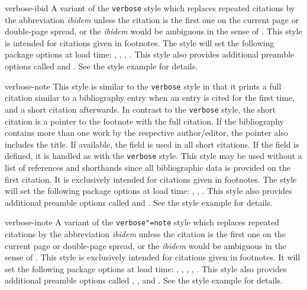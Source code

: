 \begin{marglist}
\item[verbose-ibid]
A variant of the \texttt{verbose} style which replaces repeated citations by the abbreviation \emph{ibidem} unless the citation is the first one on the current page or double-page spread, or the \emph{ibidem} would be ambiguous in the sense of . This style is intended for citations given in footnotes. The style will set the following package options at load time: , , , . This style also provides additional preamble options called  and . See the style example for details.

\item[verbose-note]
This style is similar to the \texttt{verbose} style in that it prints a full citation similar to a bibliography entry when an entry is cited for the first time, and a short citation afterwards. In contrast to the \texttt{verbose} style, the short citation is a pointer to the footnote with the full citation. If the bibliography contains more than one work by the respective author\slash editor, the pointer also includes the title. If available, the  field is used in all short citations. If the  field is defined, it is handled as with the \texttt{verbose} style. This style may be used without a list of references and shorthands since all bibliographic data is provided on the first citation. It is exclusively intended for citations given in footnotes. The style will set the following package options at load time: , , . This style also provides additional preamble options called  and . See the style example for details.

\item[verbose-inote]
A variant of the \texttt{verbose"=note} style which replaces repeated citations by the abbreviation \emph{ibidem} unless the citation is the first one on the current page or double-page spread, or the \emph{ibidem} would be ambiguous in the sense of . This style is exclusively intended for citations given in footnotes. It will set the following package options at load time: , , , , . This style also provides additional preamble options called , , and . See the style example for details.


\end{marglist}
